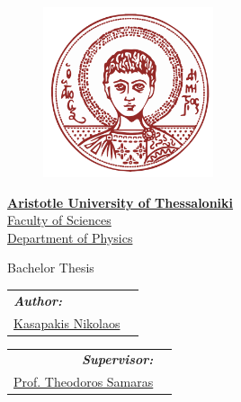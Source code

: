 \begin{titlepage}
\begin{figure}[H]
    \centering
    \includegraphics[width=5cm]{assets/logo/AUTh_Logo.pdf}
    \label{fig:cover_auth_logo}
\end{figure}

\centering
\Large \href{https://www.auth.gr/}{\textbf{Aristotle University of Thessaloniki}}\\
\large \href{http://www.sci.auth.gr/}{Faculty of Sciences}\\
\large \href{https://www.physics.auth.gr/}{Department of Physics}

\vspace{18pt}

\large Bachelor Thesis
\vspace{12pt}

\begin{minipage}[t]{0.5\textwidth}
    \raggedright
    \begin{tabular}{ll}
        \textit{\textbf{Author:}} & \\
        \href{https://github.com/kasapakis-nk}{Kasapakis Nikolaos}\footnotemark[1] & \\
    \end{tabular}
\end{minipage}
\begin{minipage}[t]{0.49\textwidth}
    \raggedleft
    \begin{tabular}{rr}
        \textit{\textbf{Supervisor:}} & \\
        \href{https://www.physics.auth.gr/people/129}{Prof. Theodoros Samaras}\footnotemark[2] & \\
    \end{tabular}
\end{minipage}



\end{titlepage}
